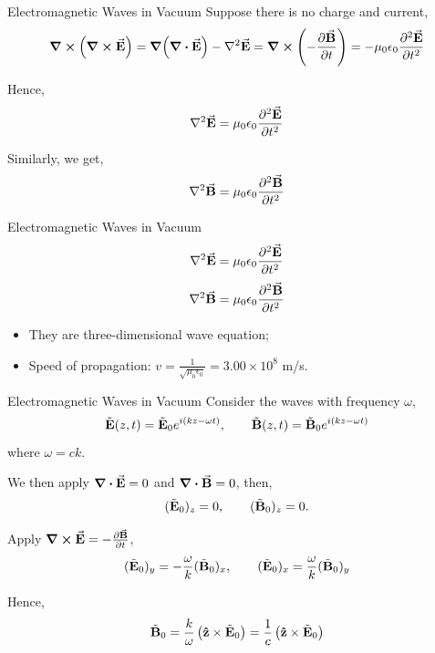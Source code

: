 \documentclass{beamer}
\begin{document}
\begin{frame}{Electromagnetic Waves in Vacuum}
    Suppose there is no charge and current,
    \begin{equation}
        \curl(\curl \va{E}) = \grad(\div \va{E}) - \laplacian \va{E} = \curl \left( - \pdv{\va{B}}{t} \right) = -\mu_0 \epsilon_0 \pdv[2]{\va{E}}{t}
    \end{equation}

    Hence,
    \begin{equation}
        \laplacian \va{E} = \mu_0 \epsilon_0 \pdv[2]{\va{E}}{t}
    \end{equation}

    Similarly, we get,
    \begin{equation}
        \laplacian \va{B} = \mu_0 \epsilon_0 \pdv[2]{\va{B}}{t}
    \end{equation}
\end{frame}

\begin{frame}{Electromagnetic Waves in Vacuum}
    \begin{equation}
        \laplacian \va{E} = \mu_0 \epsilon_0 \pdv[2]{\va{E}}{t}
    \end{equation}
    \begin{equation}
        \laplacian \va{B} = \mu_0 \epsilon_0 \pdv[2]{\va{B}}{t}
    \end{equation}

    \begin{itemize}
        \item They are three-dimensional wave equation;
        \item Speed of propagation: $v = \frac{1}{\sqrt{\mu_0 \epsilon_0}} = 3.00 \times 10^8$ m/s.
    \end{itemize}
\end{frame}

\begin{frame}{Electromagnetic Waves in Vacuum}
    Consider the waves with frequency $\omega$,
    \begin{equation}
        \tilde{\vb{E}}(z, t) = \tilde{\vb{E}}_0 e^{i(kz - \omega t)}, \qquad \tilde{\vb{B}}(z, t) = \tilde{\vb{B}}_0 e^{i(kz - \omega t)}
    \end{equation}
    where $\omega = c k$.

    We then apply $\div \va{E} = 0$ and $\div \va{B} = 0$, then,
    \begin{equation}
        (\tilde{\vb{E}}_0)_z = 0, \qquad (\tilde{\vb{B}}_0)_z = 0.
    \end{equation}

    Apply $\curl \va{E} = -\pdv{\va{B}}{t}$,
    \begin{equation}
        (\tilde{\vb{E}}_0)_y = -\frac{\omega}{k} (\tilde{\vb{B}}_0)_x, \qquad (\tilde{\vb{E}}_0)_x = \frac{\omega}{k} (\tilde{\vb{B}}_0)_y
    \end{equation}

    Hence,
    \begin{equation}
        \tilde{\vb{B}}_0 = \frac{k}{\omega} \left(\vu{z} \times \tilde{\vb{E}}_0 \right) = \frac{1}{c} \left(\vu{z} \times \tilde{\vb{E}}_0 \right)
    \end{equation}
\end{frame}
\end{document}
